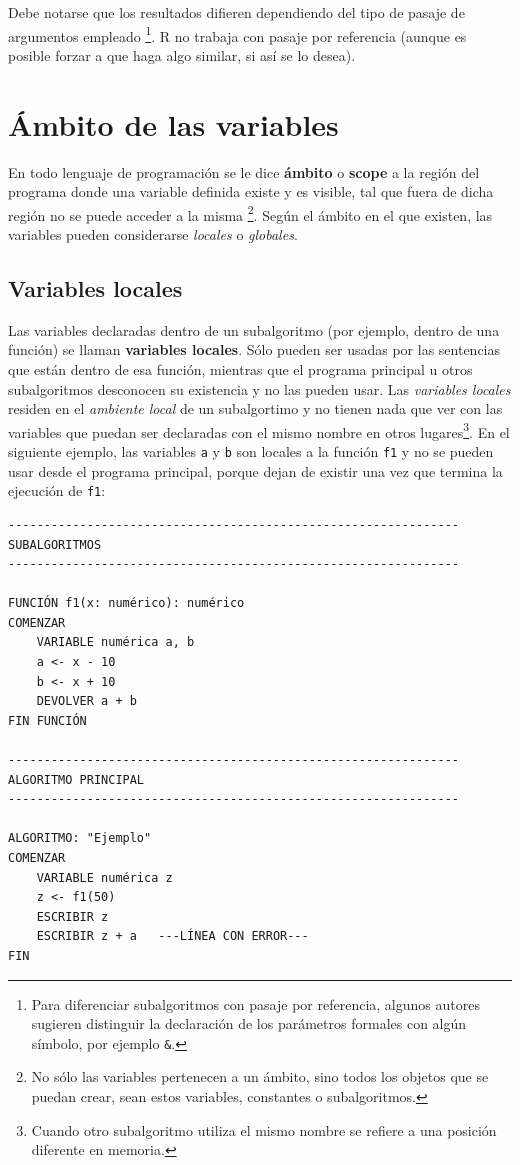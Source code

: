 \documentclass[
]{book}
\begin{document}
Debe notarse que los resultados difieren dependiendo del tipo de pasaje de argumentos empleado
\footnote{Para diferenciar subalgoritmos con pasaje por referencia, algunos autores sugieren distinguir la declaración de los parámetros formales con algún símbolo, por ejemplo \texttt{\&}.}. R no trabaja con pasaje por referencia (aunque es posible forzar a que haga algo similar, si así se lo desea).

\hypertarget{uxe1mbito-de-las-variables}{%
\section{Ámbito de las variables}\label{uxe1mbito-de-las-variables}}

En todo lenguaje de programación se le dice \textbf{ámbito} o \textbf{scope} a la región del programa donde una variable definida existe y es visible, tal que fuera de dicha región no se puede acceder a la misma
\footnote{No sólo las variables pertenecen a un ámbito, sino todos los objetos que se puedan crear, sean estos variables, constantes o subalgoritmos.}. Según el ámbito en el que existen, las variables pueden considerarse \emph{locales} o \emph{globales}.

\hypertarget{variables-locales}{%
\subsection{Variables locales}\label{variables-locales}}

Las variables declaradas dentro de un subalgoritmo (por ejemplo, dentro de una función) se llaman \textbf{variables locales}. Sólo pueden ser usadas por las sentencias que están dentro de esa función, mientras que el programa principal u otros subalgoritmos desconocen su existencia y no las pueden usar. Las \emph{variables locales} residen en el \emph{ambiente local} de un subalgortimo y no tienen nada que ver con las variables que puedan ser declaradas con el mismo nombre en otros lugares\footnote{Cuando otro subalgoritmo utiliza el mismo nombre se refiere a una posición diferente en memoria.}. En el siguiente ejemplo, las variables \texttt{a} y \texttt{b} son locales a la función \texttt{f1} y no se pueden usar desde el programa principal, porque dejan de existir una vez que termina la ejecución de \texttt{f1}:

\begin{verbatim}
---------------------------------------------------------------
SUBALGORITMOS
---------------------------------------------------------------

FUNCIÓN f1(x: numérico): numérico
COMENZAR
    VARIABLE numérica a, b
    a <- x - 10
    b <- x + 10
    DEVOLVER a + b
FIN FUNCIÓN

---------------------------------------------------------------
ALGORITMO PRINCIPAL
---------------------------------------------------------------

ALGORITMO: "Ejemplo"
COMENZAR
    VARIABLE numérica z
    z <- f1(50)
    ESCRIBIR z
    ESCRIBIR z + a   ---LÍNEA CON ERROR---
FIN
\end{verbatim}
\end{document}
